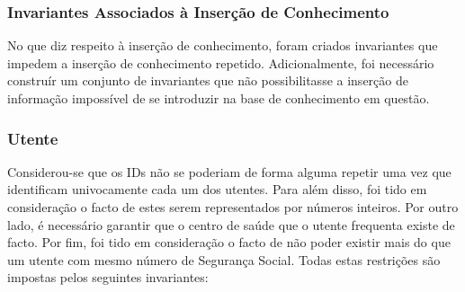 \subsubsection{Invariantes Associados à Inserção de Conhecimento}

No que diz respeito à inserção de conhecimento, foram criados invariantes que impedem a inserção de conhecimento repetido.
Adicionalmente, foi necessário construír um conjunto de invariantes que não possibilitasse a inserção de informação impossível
de se introduzir na base de conhecimento em questão.

\subsubsection*{Utente}
Considerou-se que os IDs não se poderiam de forma alguma repetir uma vez que identificam univocamente cada um dos utentes.
Para além disso, foi tido em consideração o facto de estes serem representados por números inteiros. Por outro lado, é
necessário garantir que o centro de saúde que o utente frequenta existe de facto. Por fim, foi tido em consideração o facto
de não poder existir mais do que um utente com mesmo número de Segurança Social. Todas estas restrições são impostas
pelos seguintes invariantes:

\

